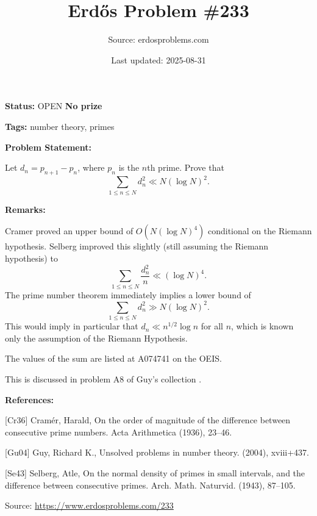 \documentclass{article}
\title{Erd\H{o}s Problem \#233}
\date{Last updated: 2025-08-31}
\author{Source: erdosproblems.com}
\begin{document}
\maketitle

\noindent\textbf{Status:} OPEN \quad \textbf{No prize}

\noindent\textbf{Tags:} number theory, primes

\medskip
\noindent\textbf{Problem Statement:}

Let $d_n=p_{n+1}-p_n$, where $p_n$ is the $n$th prime. Prove that\[\sum_{1\leq n\leq N}d_n^2 \ll N(\log N)^2.\]

\bigskip
\noindent\textbf{Remarks:}

Cramer \cite{Cr36} proved an upper bound of $O(N(\log N)^4)$ conditional on the Riemann hypothesis. Selberg \cite{Se43} improved this slightly (still assuming the Riemann hypothesis) to\[\sum_{1\leq n\leq N}\frac{d_n^2}{n}\ll (\log N)^4.\]The prime number theorem immediately implies a lower bound of\[\sum_{1\leq n\leq N}d_n^2\gg N(\log N)^2.\]This would imply in particular that $d_n\ll n^{1/2}\log n$ for all $n$, which is known only the assumption of the Riemann Hypothesis.

The values of the sum are listed at A074741 on the OEIS.

This is discussed in problem A8 of Guy's collection \cite{Gu04}.

\bigskip
\noindent\textbf{References:}

[Cr36] Cram\'{e}r, Harald, On the order of magnitude of the difference between consecutive prime numbers. Acta Arithmetica (1936), 23--46.
 
 [Gu04] Guy, Richard K., Unsolved problems in number theory. (2004), xviii+437.
 
 [Se43] Selberg, Atle, On the normal density of primes in small intervals, and the
difference between consecutive primes. Arch. Math. Naturvid. (1943), 87--105.

\bigskip
\noindent\small{Source: \url{https://www.erdosproblems.com/233}}
\end{document}
